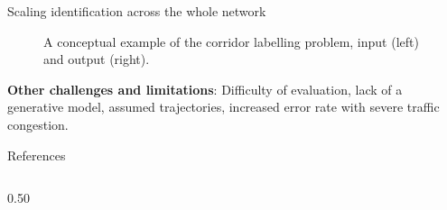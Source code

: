 \documentclass[final]{beamer}
\newlength{\colwidth}
\begin{document}
\begin{frame}[t]
\begin{columns}[t]
\begin{column}{\colwidth}
\begin{block}{Scaling identification across the whole network}
      \begin{figure}
        \centering
        \quad\quad
        \caption{A conceptual example of the corridor labelling problem, input (left) and output (right).}
        \label{fig:corridors}
      \end{figure}

      \vspace{-1cm}

      \textbf{Other challenges and limitations}: Difficulty of evaluation,
      lack of a generative model, assumed trajectories, increased error rate
      with severe traffic congestion.

  \end{block}

  \begin{block}{References}

    \vspace{-0.20cm}

    \footnotesize{
      
    }

    \vspace{-0.50cm}

  \end{block}

  \begin{columns}[t] %

    \begin{column}{0.50\colwidth}


\end{column}
\end{columns}
\end{column}
\end{columns}
\end{frame}
\end{document}
